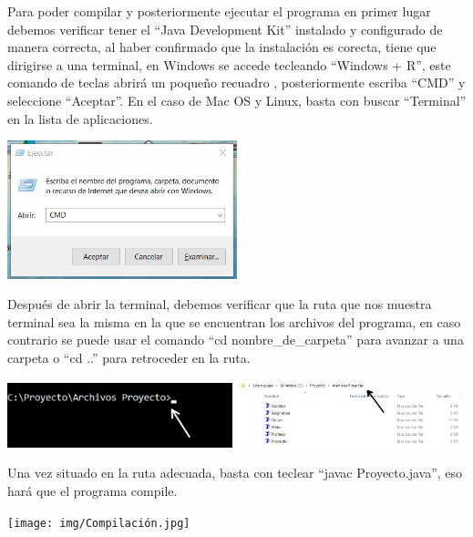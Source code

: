 \documentclass[12pt]{report}
\begin{document}
Para poder compilar y posteriormente ejecutar el programa en primer lugar debemos verificar tener el ``Java Development Kit'' instalado y configurado de manera correcta, al haber confirmado que la instalación es corecta, tiene que dirigirse a una terminal, en Windows se accede tecleando ``Windows + R'', este comando de teclas abrirá un poqueño recuadro , posteriormente escriba ``CMD'' y seleccione ``Aceptar''. En el caso de Mac OS y Linux, basta con buscar ``Terminal'' en la lista de aplicaciones.

\begin{center}
    \includegraphics[width=0.5\textwidth]{img/Ejecutar.jpg}
\end{center}

Después de abrir la terminal, debemos verificar que la ruta que nos muestra terminal sea la misma en la que se encuentran los archivos del programa, en caso contrario se puede usar el comando ``cd nombre\_de\_carpeta'' para avanzar a una carpeta o ``cd ..'' para retroceder en la ruta.

    \begin{center}
    \includegraphics[width = 0.49\textwidth]{img/Ruta Archivos CMD.jpg}
    \includegraphics[width = 0.49\textwidth]{img/Ruta Archivos.jpg}
    \end{center}

Una vez situado en la ruta adecuada, basta con teclear ``javac Proyecto.java'', eso hará que el programa compile.

\begin{center}
    \texttt{[image: img/Compilación.jpg]}
\end{center}
\end{document}
